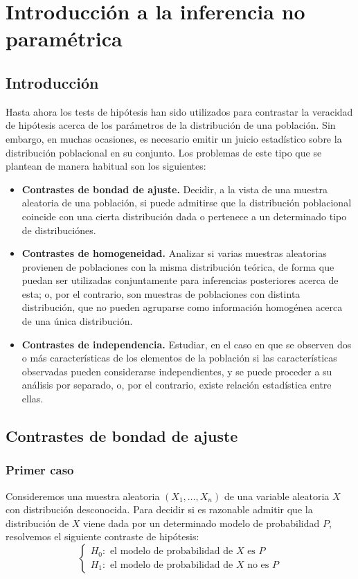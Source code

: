 \chapter{Introducción a la inferencia no paramétrica}
\section{Introducción}
Hasta ahora los tests de hipótesis han sido utilizados para contrastar la veracidad de hipótesis acerca de los parámetros de la distribución de una población.
Sin embargo, en muchas ocasiones, es necesario emitir un juicio estadístico sobre la distribución poblacional en su conjunto.
Los problemas de este tipo que se plantean de manera habitual son los siguientes:
\begin{itemize}
    \item \textbf{Contrastes de bondad de ajuste.}
          Decidir, a la vista de una muestra aleatoria de una población, si puede admitirse que la distribución poblacional coincide con una cierta distribución dada o pertenece a un determinado tipo de distribuciónes.
    \item \textbf{Contrastes de homogeneidad.}
          Analizar si varias muestras aleatorias provienen de poblaciones con la misma distribución teórica, de forma que puedan ser utilizadas conjuntamente para inferencias posteriores acerca de esta; o, por el contrario, son muestras de poblaciones con distinta distribución, que no pueden agruparse como información homogénea acerca de una única distribución.
    \item \textbf{Contrastes de independencia.}
          Estudiar, en el caso en que se observen dos o más características de los elementos de la población si las características observadas pueden considerarse independientes, y se puede proceder a su análisis por separado, o, por el contrario, existe relación estadística entre ellas.
\end{itemize}

\section{Contrastes de bondad de ajuste}
\subsection*{Primer caso}
Consideremos una muestra aleatoria $(X_1, \dots, X_n)$ de una variable aleatoria $X$ con distribución desconocida.
Para decidir si es razonable admitir que la distribución de $X$ viene dada por un determinado modelo de probabilidad $P$, resolvemos el siguiente contraste de hipótesis:
$$\begin{cases}
        H_0: \text{ el modelo de probabilidad de } X \text{ es } P \\
        H_1: \text{ el modelo de probabilidad de } X \text{ no es } P
    \end{cases}$$


